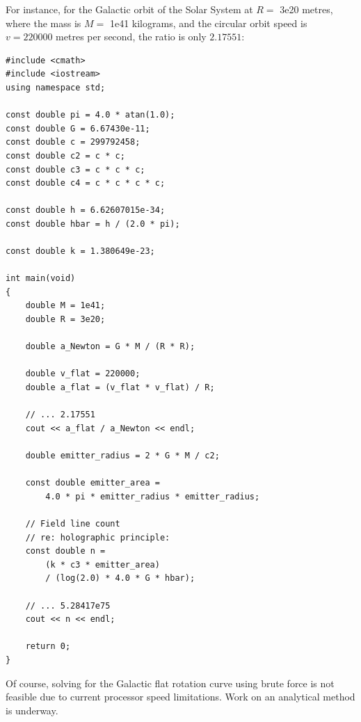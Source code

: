 \documentclass[12pt]{article}
\begin{document}
For instance, for the Galactic orbit of the Solar System at $R = $ 3e20 metres, where the mass is $M = $ 1e41 kilograms, and the circular orbit speed is $v = 220000$ metres per second, the ratio is only $2.17551$:
\begin{lstlisting}
#include <cmath>
#include <iostream>
using namespace std;

const double pi = 4.0 * atan(1.0);
const double G = 6.67430e-11;
const double c = 299792458;
const double c2 = c * c;
const double c3 = c * c * c;
const double c4 = c * c * c * c;

const double h = 6.62607015e-34;
const double hbar = h / (2.0 * pi);

const double k = 1.380649e-23;

int main(void)
{
	double M = 1e41;
	double R = 3e20;

	double a_Newton = G * M / (R * R);

	double v_flat = 220000;
	double a_flat = (v_flat * v_flat) / R;

	// ... 2.17551
	cout << a_flat / a_Newton << endl;

	double emitter_radius = 2 * G * M / c2;

	const double emitter_area =
		4.0 * pi * emitter_radius * emitter_radius;

	// Field line count
	// re: holographic principle:
	const double n =
		(k * c3 * emitter_area)
		/ (log(2.0) * 4.0 * G * hbar);

	// ... 5.28417e75
	cout << n << endl;

	return 0;
}
\end{lstlisting}
Of course, solving for the Galactic flat rotation curve using brute force is not feasible due to current processor speed limitations.
Work on an analytical method is underway.
\end{document}
